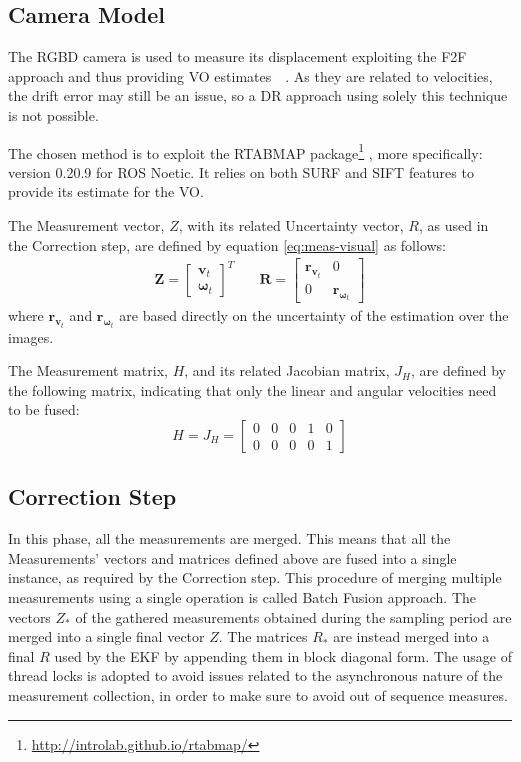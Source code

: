 \subsection{Camera Model}
\noindent The \gls{RGBD} camera is used to measure its displacement exploiting the \gls{F2F} approach and thus providing \gls{VO} estimates~\cite{camera}~\cite{cameraa}.
As they are related to velocities, the drift error may still be an issue, so a \gls{DR} approach using solely this technique is not possible.

The chosen method is to exploit the \gls{RTABMAP} package\footnote{\url{http://introlab.github.io/rtabmap/}}\cite{6094602} \cite{labbe_rtab-map_2019}, more specifically: version 0.20.9 for \gls{ROS} Noetic.
It relies on both \gls{SURF} and \gls{SIFT} features to provide its estimate for the \gls{VO}.

The Measurement vector, $Z$, with its related Uncertainty vector, $R$, as used in the Correction step, are defined by equation \eqref{eq:meas-visual} as follows:  
\begin{align}
\label{eq:meas-visual}
\mathbf{Z}
=
\begin{bmatrix}
\mathbf{v}_t \\
\boldsymbol \omega_{t}
\end{bmatrix}^T
& \quad
\mathbf{R}
=
\begin{bmatrix}
\mathbf{r}_{\mathbf{v}_{t}} & 0 \\
 0 &  \mathbf{r}_{\boldsymbol \omega_t}
\end{bmatrix}
\end{align}
where $\mathbf{r}_{\mathbf{v}_{t}}$ and $\mathbf{r}_{\boldsymbol \omega_t}$ are based directly on the uncertainty of the estimation over the images.

The Measurement matrix, $H$, and its related Jacobian matrix, $J_H$, are defined by the following matrix, indicating that only the linear and angular velocities need to be fused:
\begin{equation}
H = J_H =
\begin{bmatrix}
0 & 0 & 0 & 1 & 0 \\
0 & 0 & 0 & 0 & 1
\end{bmatrix}
\end{equation}


\subsection{Correction Step}

\noindent
In this phase, all the measurements are merged.
This means that all the Measurements' vectors and matrices defined above are fused into a single instance, as required by the Correction step.
This procedure of merging multiple measurements using a single operation is called Batch Fusion approach.
The vectors $Z_*$ of the gathered measurements obtained during the sampling period are merged into a single final vector $Z$.
The matrices $R_*$ are instead merged into a final $R$ used by the \gls{EKF} by appending them in block diagonal form.
The usage of thread locks is adopted to avoid issues related to the asynchronous nature of the measurement collection, in order to make sure to avoid out of sequence measures.

